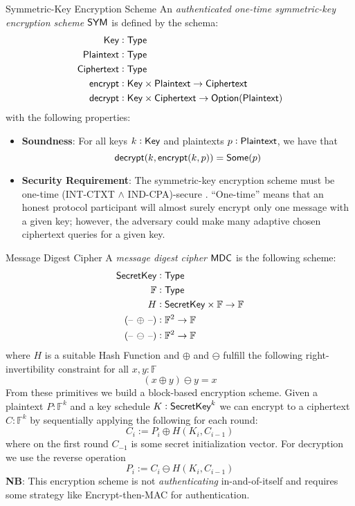 \begin{definitiontoc}{Symmetric-Key Encryption Scheme} \label{def:abstract-symm}
    An \emph{authenticated one-time symmetric-key encryption scheme} ${\textsf{SYM}}$ is defined by the schema:
    \begin{align*}
        {\textsf{Key}} &: {\textsf{Type}} \\
        {\textsf{Plaintext}} &: {\textsf{Type}} \\
        {\textsf{Ciphertext}} &: {\textsf{Type}} \\
        {\textsf{encrypt}} &: {\textsf{Key}} \times {\textsf{Plaintext}} \to {\textsf{Ciphertext}} \\
        {\textsf{decrypt}} &: {\textsf{Key}} \times {\textsf{Ciphertext}} \to {\textsf{Option}}({\textsf{Plaintext}})
    \end{align*}
    with the following properties:
    \begin{itemize}
        \item \textbf{Soundness}: For all keys $k : {\textsf{Key}}$ and plaintexts $p : {\textsf{Plaintext}}$, we have that
            \[{\textsf{decrypt}}(k, {\textsf{encrypt}}(k, p)) = {\textsf{Some}}(p)\]
        \item \textbf{Security Requirement}: The symmetric-key encryption scheme must be one-time (INT-CTXT $\land$ IND-CPA)-secure \cite{BC2000AC}. ``One-time'' means that an honest protocol participant will almost surely encrypt only one message with a given key; however, the adversary could make many adaptive chosen ciphertext queries for a given key.
    \end{itemize}
\end{definitiontoc}

\begin{definitiontoc}{Message Digest Cipher}
    A \emph{message digest cipher} ${\textsf{MDC}}$ is the following scheme:
    \begin{align*}
        {\textsf{SecretKey}} &: {\textsf{Type}} \\
        \mathbb{F} &: {\textsf{Type}} \\
        H          &: {\textsf{SecretKey}} \times \mathbb{F} \to \mathbb{F} \\
        \left({\textrm{--}}\,\oplus\,{\textrm{--}}\right) &: \mathbb{F}^2 \to \mathbb{F} \\
        \left({\textrm{--}}\,\ominus\,{\textrm{--}}\right) &: \mathbb{F}^2 \to \mathbb{F}
    \end{align*}
    where $H$ is a suitable Hash Function and $\oplus$ and $\ominus$ fulfill the following right-invertibility constraint for all $x, y : \mathbb{F}$
    \[(x \oplus y) \ominus y = x\]
    From these primitives we build a block-based encryption scheme. Given a plaintext $P : \mathbb{F}^k$ and a key schedule $K : {\textsf{SecretKey}}^k$ we can encrypt to a ciphertext $C : \mathbb{F}^k$ by sequentially applying the following for each round:
    \[C_i := P_i \oplus H(K_i, C_{i-1})\]
    where on the first round $C_{-1}$ is some secret initialization vector. For decryption we use the reverse operation
    \[P_i := C_i \ominus H(K_i, C_{i-1})\]
    \textbf{NB}: This encryption scheme is not \emph{authenticating} in-and-of-itself and requires some strategy like Encrypt-then-MAC for authentication.
\end{definitiontoc}

